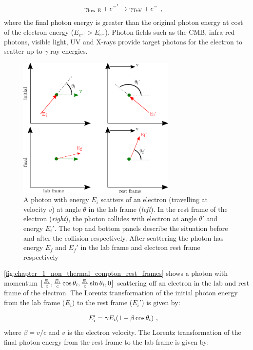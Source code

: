 \begin{align}
	\gamma_\text{low E} + e^{-'}&\rightarrow \gamma_{\TeV}+e^{-}\text{ ,}
\end{align}
where the final photon energy is greater than the original photon energy at cost of the electron energy ($E_{e^{-'}}>E_{e^-}$). Photon fields such as the CMB, infra-red photons, visible light, UV and X-rays provide target photons for the electron to scatter up to $\gamma$-ray energies. 
\newpar
\begin{figure}[h!]
	\centering
	\includegraphics[width=0.7\textwidth]{04_Introduction/Images/non_thermal_emission/inverse_compton.pdf}
	\caption{A photon with energy $E_i$ scatters of an electron (travelling at velocity $v$) at angle $\theta$ in the lab frame (\textit{left}). In the rest frame of the electron (\textit{right}), the photon collides with electron at angle $\theta'$ and energy $E_i'$. The top and bottom panels describe the situation before and after the collision respectively. After scattering the photon has energy $E_f$ and $E_f'$ in the lab frame and electron rest frame respectively}
	\label{fig:chapter_1_non_thermal_compton_rest_frames}
\end{figure}
\autoref{fig:chapter_1_non_thermal_compton_rest_frames} shows a photon with momentum $\qty[\frac{E_i}{c},\frac{E_i}{c}\cos\theta_i,\frac{E_i}{c}\sin\theta_i,0]$ scattering off an electron in the lab and rest frame of the electron. The Lorentz transformation of the initial photon energy from the lab frame ($E_i$) to the rest frame ($E_i'$) is given by:

\begin{equation}
    \begin{aligned}
        E_i'&=\gamma E_i\qty(1-\beta \cos\theta_i)\text{ ,}
    \end{aligned}    
\end{equation}
\noindent where $\beta = v/c$ and $v$ is the electron velocity. The Lorentz transformation of the final photon energy from the rest frame to the lab frame is given by:

